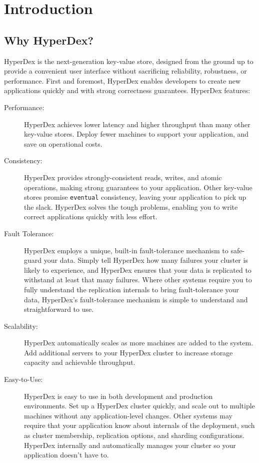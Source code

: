 \chapter{Introduction}
\label{chap:introduction}

\section{Why HyperDex?}
\label{sec:introduction:why}

HyperDex is the next-generation key-value store, designed from the ground up to
provide a convenient user interface without sacrificing reliability, robustness,
or performance.  First and foremost, HyperDex enables developers to create new
applications quickly and with strong correctness guarantees.
HyperDex features:

\begin{description}
\item[Performance:]  HyperDex achieves lower latency and higher throughput than
many other key-value stores.  Deploy fewer machines to support your application,
and save on operational costs.

\item[Consistency:]  HyperDex provides strongly-consistent reads, writes, and
atomic operations, making strong guarantees to your application.  Other
key-value stores promise \texttt{eventual} consistency, leaving your application
to pick up the slack.  HyperDex solves the tough problems, enabling you to write
correct applications quickly with less effort.

\item[Fault Tolerance:]  HyperDex employs a unique, built-in fault-tolerance
mechanism to safe-guard your data.  Simply tell HyperDex how many failures your
cluster is likely to experience, and HyperDex ensures that your data is
replicated to withstand at least that many failures.  Where other systems
require you to fully understand the replication internals to bring
fault-tolerance your data, HyperDex's fault-tolerance mechanism is simple to
understand and straightforward to use.

\item[Scalability:]  HyperDex automatically scales as more machines are added to
the system.  Add additional servers to your HyperDex cluster to increase storage
capacity and achievable throughput.

\item[Easy-to-Use:]  HyperDex is easy to use in both development and production
environments.  Set up a HyperDex cluster quickly, and scale out to multiple
machines without any application-level changes.  Other systems may require that
your application know about internals of the deployment, such as cluster
membership, replication options, and sharding configurations.  HyperDex
internally and automatically manages your cluster so your application doesn't
have to.
\end{description}

